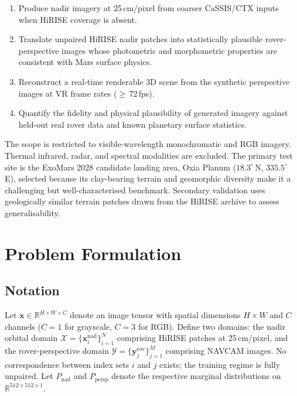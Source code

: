 \documentclass[10pt,journal]{IEEEtran}
\begin{document}
\begin{enumerate}
  \item[\textbf{O1.}] Produce nadir imagery at 25\,cm/pixel from coarser
    CaSSIS/CTX inputs when HiRISE coverage is absent.
  \item[\textbf{O2.}] Translate unpaired HiRISE nadir patches into statistically
    plausible rover-perspective images whose photometric and morphometric
    properties are consistent with Mars surface physics.
  \item[\textbf{O3.}] Reconstruct a real-time renderable 3D scene from the
    synthetic perspective images at VR frame rates ($\geq$\,72\,fps).
  \item[\textbf{O4.}] Quantify the fidelity and physical plausibility of
    generated imagery against held-out real rover data and known planetary
    surface statistics.
\end{enumerate}

The scope is restricted to visible-wavelength monochromatic and RGB imagery.
Thermal infrared, radar, and spectral modalities are excluded. The primary test
site is the ExoMars 2028 candidate landing area, Oxia Planum
($18.3^{\circ}$\,N, $335.5^{\circ}$\,E), selected because its clay-bearing
terrain and geomorphic diversity make it a challenging but well-characterised
benchmark. Secondary validation uses geologically similar terrain patches drawn
from the HiRISE archive to assess generalisability.

\section{Problem Formulation}
\label{sec:formulation}

\subsection{Notation}
Let $\mathbf{x} \in \mathbb{R}^{H \times W \times C}$ denote an image tensor
with spatial dimensions $H \times W$ and $C$ channels ($C=1$ for grayscale,
$C=3$ for RGB). Define two domains: the nadir orbital domain
$\mathcal{X} = \{{\mathbf{x}_i^{\mathrm{nad}}}\}_{i=1}^{N}$ comprising HiRISE
patches at 25\,cm/pixel, and the rover-perspective domain
$\mathcal{Y} = \{{\mathbf{y}_j^{\mathrm{rov}}}\}_{j=1}^{M}$ comprising NAVCAM
images. No correspondence between index sets $i$ and $j$ exists; the training
regime is fully unpaired. Let $P_{\mathrm{nad}}$ and $P_{\mathrm{persp}}$ denote
the respective marginal distributions on $\mathbb{R}^{512 \times 512 \times 1}$.
\end{document}
